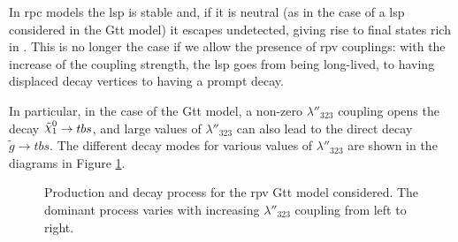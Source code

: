 In \gls{rpc} models the \gls{lsp} is stable and, if it is neutral (as in the case of a \ninoone \gls{lsp} 
considered in the Gtt model) it escapes undetected, giving rise to final states rich in \met. 
This is no longer the case if we allow the presence of \gls{rpv} couplings: with the increase of the 
coupling strength, the \gls{lsp} goes from being long-lived, to having displaced decay vertices to 
having a prompt decay. 

In particular, in the case of the Gtt model, a non-zero $\lambda''_{323}$ coupling opens the decay 
$\ninoone \rightarrow t b s$, and large values  of $\lambda''_{323}$ can also lead to the 
direct decay $\tilde{g} \rightarrow t b s$. The different decay modes for various values of  
$\lambda''_{323}$ are shown in the diagrams in Figure \ref{fig:rpcrpv_diagrams}.
 

\begin{figure}[htbp]
	\centering 
	\caption{Production and decay process for the \gls{rpv} Gtt model considered.
	 The dominant process varies with increasing $\lambda''_{323}$ coupling from left to right.}
	\label{fig:rpcrpv_diagrams}
\end{figure}

